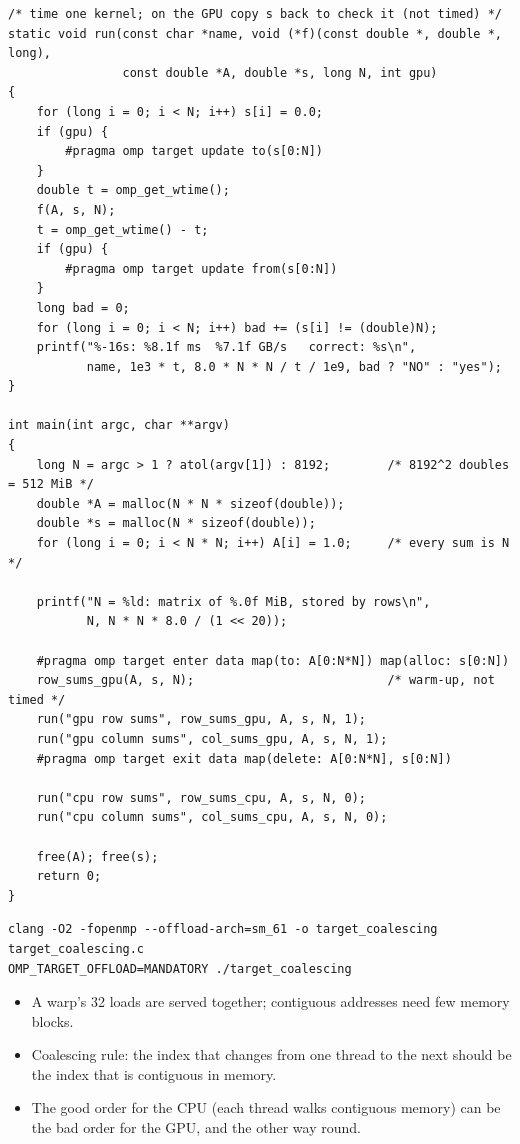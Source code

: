 \documentclass[11pt,a4paper]{article}
\let\origtexttt\texttt
\renewcommand{\texttt}[1]{\textcolor{black!60}{\origtexttt{#1}}}
\begin{document}
\begin{lstlisting}[caption={\textbf{\origtexttt{target\_coalescing.c}} -- row and column sums of a matrix stored by rows, on the GPU and on the CPU.}, label={lst:coal}]
/* time one kernel; on the GPU copy s back to check it (not timed) */
static void run(const char *name, void (*f)(const double *, double *, long),
                const double *A, double *s, long N, int gpu)
{
    for (long i = 0; i < N; i++) s[i] = 0.0;
    if (gpu) {
        #pragma omp target update to(s[0:N])
    }
    double t = omp_get_wtime();
    f(A, s, N);
    t = omp_get_wtime() - t;
    if (gpu) {
        #pragma omp target update from(s[0:N])
    }
    long bad = 0;
    for (long i = 0; i < N; i++) bad += (s[i] != (double)N);
    printf("%-16s: %8.1f ms  %7.1f GB/s   correct: %s\n",
           name, 1e3 * t, 8.0 * N * N / t / 1e9, bad ? "NO" : "yes");
}

int main(int argc, char **argv)
{
    long N = argc > 1 ? atol(argv[1]) : 8192;        /* 8192^2 doubles = 512 MiB */
    double *A = malloc(N * N * sizeof(double));
    double *s = malloc(N * sizeof(double));
    for (long i = 0; i < N * N; i++) A[i] = 1.0;     /* every sum is N */

    printf("N = %ld: matrix of %.0f MiB, stored by rows\n",
           N, N * N * 8.0 / (1 << 20));

    #pragma omp target enter data map(to: A[0:N*N]) map(alloc: s[0:N])
    row_sums_gpu(A, s, N);                           /* warm-up, not timed */
    run("gpu row sums", row_sums_gpu, A, s, N, 1);
    run("gpu column sums", col_sums_gpu, A, s, N, 1);
    #pragma omp target exit data map(delete: A[0:N*N], s[0:N])

    run("cpu row sums", row_sums_cpu, A, s, N, 0);
    run("cpu column sums", col_sums_cpu, A, s, N, 0);

    free(A); free(s);
    return 0;
}
\end{lstlisting}

\begin{lstlisting}[style=sh]
clang -O2 -fopenmp --offload-arch=sm_61 -o target_coalescing target_coalescing.c
OMP_TARGET_OFFLOAD=MANDATORY ./target_coalescing
\end{lstlisting}

\begin{keyidea}
\begin{itemize}
  \item A warp's 32 loads are served together; contiguous addresses need few memory blocks.
  \item Coalescing rule: the index that changes from one thread to the next should be the index
        that is contiguous in memory.
  \item The good order for the CPU (each thread walks contiguous memory) can be the bad order for
        the GPU, and the other way round.
\end{itemize}
\end{keyidea}
\end{document}
